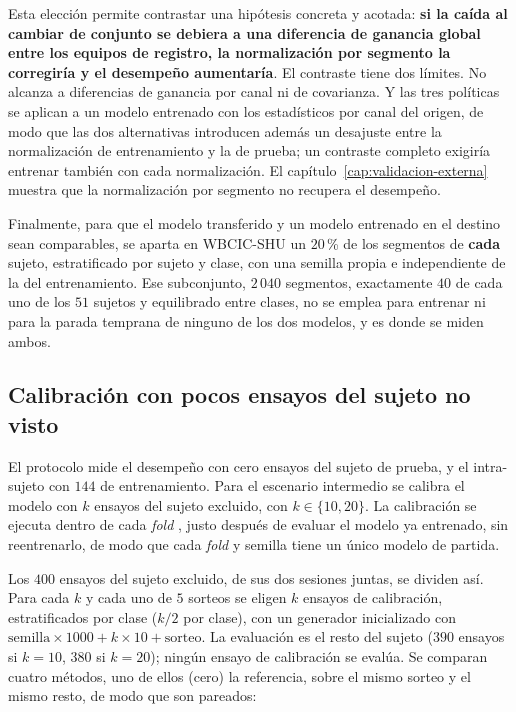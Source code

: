 Esta elección permite contrastar una hipótesis concreta y acotada: \textbf{si la caída al
cambiar de conjunto se debiera a una diferencia de ganancia global entre los equipos de
registro, la normalización por segmento la corregiría y el desempeño aumentaría}. El
contraste tiene dos límites. No alcanza a diferencias de ganancia por canal ni de
covarianza. Y las tres políticas se aplican a un modelo entrenado con los estadísticos por
canal del origen, de modo que las dos alternativas introducen además un desajuste entre
la normalización de entrenamiento y la de prueba; un contraste completo exigiría entrenar
también con cada normalización. El capítulo~\ref{cap:validacion-externa} muestra que la
normalización por segmento no recupera el desempeño.

Finalmente, para que el modelo transferido y un modelo entrenado en el destino sean
comparables, se aparta en WBCIC-SHU un $20$\,\% de los segmentos de \textbf{cada} sujeto,
estratificado por sujeto y clase, con una semilla propia e independiente de la del
entrenamiento. Ese subconjunto, $2\,040$ segmentos, exactamente $40$ de cada uno de los
$51$ sujetos y equilibrado entre clases, no se emplea para entrenar ni para la parada
temprana de ninguno de los dos modelos, y es donde se miden ambos.

\subsection{Calibración con pocos ensayos del sujeto no visto}
\label{sec:metodo-fewshot}

El protocolo \loso{} mide el desempeño con cero ensayos del sujeto de prueba, y el
intra-sujeto con $144$ de entrenamiento. Para el escenario intermedio se calibra el modelo
con $k$ ensayos del sujeto excluido, con $k \in \{10, 20\}$. La calibración se ejecuta
dentro de cada \textit{fold} \loso{}, justo después de evaluar el modelo ya entrenado, sin
reentrenarlo, de modo que cada \textit{fold} y semilla tiene un único modelo de partida.

Los $400$ ensayos del sujeto excluido, de sus dos sesiones juntas, se dividen así. Para cada
$k$ y cada uno de $5$ sorteos se eligen $k$ ensayos de calibración, estratificados por clase
($k/2$ por clase), con un generador inicializado con $\mathrm{semilla}\times 1000 + k\times 10 +
\mathrm{sorteo}$. La evaluación es el resto del sujeto ($390$ ensayos si $k = 10$, $380$ si
$k = 20$); ningún ensayo de calibración se evalúa. Se comparan cuatro métodos, uno de ellos (cero) la referencia, sobre el mismo
sorteo y el mismo resto, de modo que son pareados:

